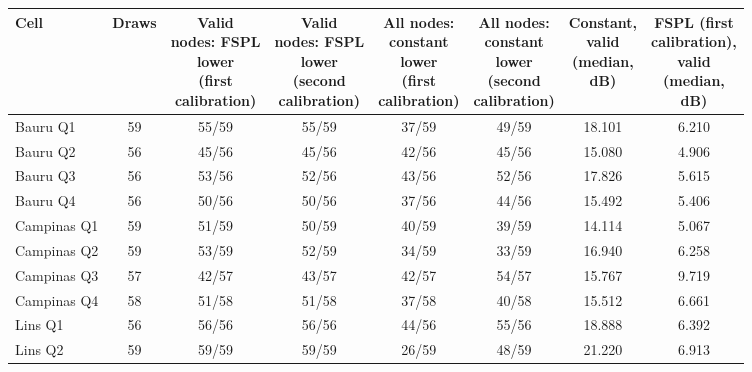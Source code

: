 \begin{tabular}{lccccccc}
\toprule
Cell & Draws & \celula{Valid \\ \relax nodes: FSPL \\ \relax lower \\ \relax (first \\ \relax calibration)} & \celula{Valid \\ \relax nodes: FSPL \\ \relax lower \\ \relax (second \\ \relax calibration)} & \celula{All nodes: \\ \relax constant \\ \relax lower \\ \relax (first \\ \relax calibration)} & \celula{All nodes: \\ \relax constant \\ \relax lower \\ \relax (second \\ \relax calibration)} & \celula{Constant, \\ \relax valid \\ \relax (median, \\ \relax dB)} & \celula{FSPL (first \\ \relax calibration), \\ \relax valid \\ \relax (median, \\ \relax dB)} \\
\midrule
Bauru Q1 & 59 & 55/59 & 55/59 & 37/59 & 49/59 & 18.101 & 6.210 \\
Bauru Q2 & 56 & 45/56 & 45/56 & 42/56 & 45/56 & 15.080 & 4.906 \\
Bauru Q3 & 56 & 53/56 & 52/56 & 43/56 & 52/56 & 17.826 & 5.615 \\
Bauru Q4 & 56 & 50/56 & 50/56 & 37/56 & 44/56 & 15.492 & 5.406 \\
Campinas Q1 & 59 & 51/59 & 50/59 & 40/59 & 39/59 & 14.114 & 5.067 \\
Campinas Q2 & 59 & 53/59 & 52/59 & 34/59 & 33/59 & 16.940 & 6.258 \\
Campinas Q3 & 57 & 42/57 & 43/57 & 42/57 & 54/57 & 15.767 & 9.719 \\
Campinas Q4 & 58 & 51/58 & 51/58 & 37/58 & 40/58 & 15.512 & 6.661 \\
Lins Q1 & 56 & 56/56 & 56/56 & 44/56 & 55/56 & 18.888 & 6.392 \\
Lins Q2 & 59 & 59/59 & 59/59 & 26/59 & 48/59 & 21.220 & 6.913 \\

\end{tabular}
